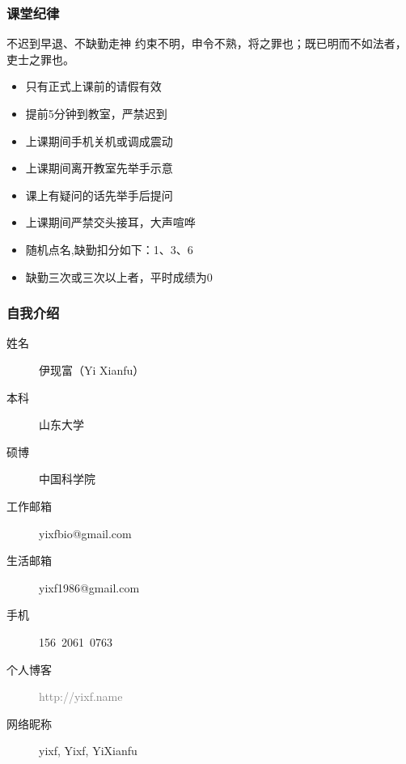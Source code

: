 \begin{frame}
  \frametitle{课堂纪律}
  \begin{alertblock}{不迟到早退、不缺勤走神}
  约束不明，申令不熟，将之罪也；既已明而不如法者，吏士之罪也。
  \end{alertblock}
  \pause
  \begin{itemize}[<+-|alert@+>]
    \item 只有正式上课前的请假有效
    \item 提前5分钟到教室，严禁迟到
    \item 上课期间手机关机或调成震动
    \item 上课期间离开教室先举手示意
    \item 课上有疑问的话先举手后提问
    \item 上课期间严禁交头接耳，大声喧哗
    \item 随机点名,缺勤扣分如下：1、3、6
    \item 缺勤三次或三次以上者，平时成绩为0
  \end{itemize}
\end{frame}

\begin{frame}
  \frametitle{自我介绍}
    \begin{description}
      \item[姓\qquad 名]伊现富（Yi Xianfu）
      \item[本\qquad 科]山东大学
      \item[硕\qquad 博]中国科学院
      \item[工作邮箱]\alert{yixfbio@gmail.com}
      \item[生活邮箱]yixf1986@gmail.com
      \item[手\qquad 机]156\ 2061\ 0763
      \item[个人博客]\textcolor{gray}{http://yixf.name}
      \item[网络昵称]yixf, Yixf, YiXianfu
    \end{description}
\end{frame}


